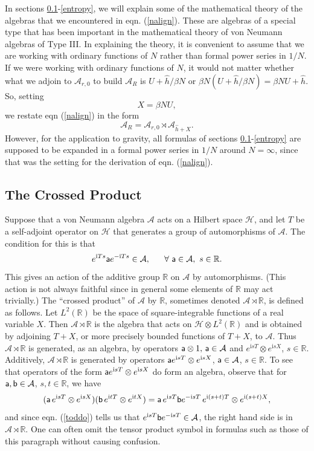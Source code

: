 \documentclass[11pt,a4paper]{article}
\def\a{{\sf a}}
\def\b{{\sf b}}
\def\i{{\mathrm i}}
\def\be{\begin{equation}}
\def\ee{\end{equation}}
\def\h{\widehat}
\def\A{{\mathcal A}}
\def\R{{\mathbb R}}
\def\U{{ U}}
\def\h{\widehat}
\def\H{{\mathcal H}}
\begin{document}
  
  In sections \ref{product}-\ref{entropy}, we will explain some of the mathematical theory of the algebras that  we encountered in eqn. (\ref{nalign}).
These are algebras of a special type that has been important in the mathematical theory of von Neumann algebras of Type III.    In explaining the theory,
it is convenient to assume that we are working with ordinary functions of $N$ rather than formal power series in $1/N$.  If we were working with ordinary
functions of $N$, it would not matter whether what we adjoin to $\A_{r,0}$ to build $\A_R$ is $\U+\h h/\beta N$ or $\beta N(\U+\h h/\beta N)=\beta N \U+\h h$.
So, setting 
\be\label{defx} X=\beta N\U,\ee 
 we restate eqn (\ref{nalign}) in the form
\be\label{palign} \A_R=\A_{r,0}\rtimes \A_{\h h+X}.\ee
However, for the application to gravity, all formulas of  sections \ref{product}-\ref{entropy} are  supposed to be expanded in a formal power series in $1/N$
around $N=\infty$, since that was the setting for the derivation of eqn. (\ref{nalign}).   

  
\subsection{The Crossed Product}\label{product}




Suppose that a von Neumann algebra  $\A$ acts on a Hilbert space $\H$, and let $T$ be a self-adjoint operator on $\H$
that generates a group of automorphisms of $\A$.   The condition for this is that 
\be\label{toddo}e^{\i T s}\a e^{-\i T s}\in \A, ~~~~~\forall ~\a\in \A,~s\in \R.\ee
This gives an action of the additive group $\R$ on $\A$ by automorphisms.  (This action is not always faithful since in general some elements of $\R$ may act trivially.)
The ``crossed product'' of $\A$ by $\R$, sometimes denoted $\A\rtimes \R$, is defined as follows.   Let $L^2(\R)$ be the space of square-integrable functions of
a real variable $X$.  Then $\A\rtimes\R$ is the algebra that acts on $\H\otimes L^2(\R)$ and is obtained by adjoining $T+X$, or more precisely bounded functions
of $T+X$, to $\A$.   Thus $\A\rtimes\R$ is generated, as an algebra, by operators $\a\otimes 1,\,\a\in \A$ and $e^{\i s T}\otimes e^{\i s X}$, $s\in \R$.  Additively, $\A\rtimes\R$ is generated by operators $\a e^{\i s T}\otimes e^{\i s X}$, $\a\in \A$, $s\in\R$.   To see that operators of the form  $\a e^{\i s T}\otimes e^{\i s X}$
do form an algebra, observe that for $\a,\b\in\A$, $s,t\in\R$, we have
\be\label{weggo}(\a \,e^{\i s T}\otimes e^{\i s X} )(\b\, e^{\i t T}\otimes e^{\i t X})=\a \,e^{\i s T}\b e^{-\i s T} \,e^{\i (s+t)T} \otimes e^{\i(s+t)X}, \ee
and since eqn. (\ref{toddo}) tells us that $e^{\i s T}\b e^{-\i s T}\in\A$, the right hand side is in $\A\rtimes\R$.
One can often omit the tensor product symbol in formulas such as those of this paragraph without causing confusion.
\end{document}
